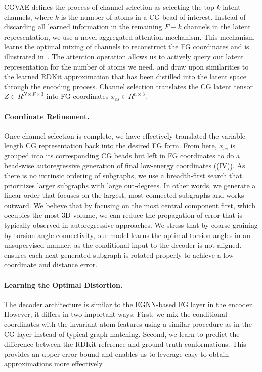 CGVAE defines the process of channel selection as selecting the top $k$ latent channels, where $k$ is the number of atoms in a CG bead of interest. Instead of discarding all learned information in the remaining $F-k$ channels in the latent representation, we use a novel aggregated attention mechanism. This mechanism learns the optimal mixing of channels to reconstruct the FG coordinates and is illustrated in~.
The attention operation allows us to actively query our latent representation for the number of atoms we need, and draw upon similarities to the learned RDKit approximation that has been distilled into the latent space through the encoding process.
Channel selection translates the CG latent tensor $Z \in R^{N\times F \times 3}$ into FG coordinates $x_{cs} \in R^{n\times 3}$.

\vspace{-1ex}
\paragraph{Coordinate Refinement.} 
Once channel selection is complete, we have effectively translated the variable-length CG representation back into the desired FG form. From here, $x_{cs}$ is grouped into its corresponding CG beads but left in FG coordinates to do a bead-wise autoregressive generation of final low-energy coordinates ((IV)). 
As there is no intrinsic ordering of subgraphs, we use a breadth-first search that prioritizes larger subgraphs with large out-degrees. In other words, we generate a linear order that focuses on the largest, most connected subgraphs and works outward. We believe that by focusing on the most central component first, which occupies the most 3D volume, we can reduce the propagation of error that is typically observed in autoregressive approaches.
We stress that by coarse-graining by torsion angle connectivity, our model learns the optimal torsion angles in an unsupervised manner, as the conditional input to the decoder is not aligned. 
\model ensures each next generated subgraph is rotated properly to achieve a low coordinate and distance error.

\vspace{-1ex}
\paragraph{Learning the Optimal Distortion.}The decoder architecture is similar to the EGNN-based FG layer in the encoder. However, it differs in two important ways. First, we mix the conditional coordinates with the invariant atom features using a similar procedure as in the CG layer instead of typical graph matching. Second, we learn to predict the difference between the RDKit reference and ground truth conformations. This provides an upper error bound and enables us to leverage easy-to-obtain approximations more effectively.

